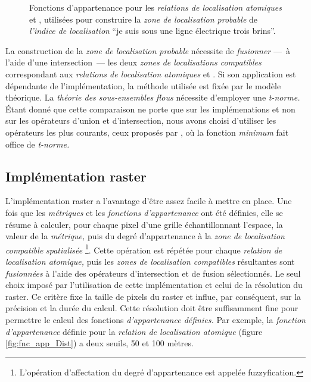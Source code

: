 \begin{figure}
  \centering \subfloat[]{%
    
    \label{fig:fnc_app_Dist}
  }
  \hfill%
  \subfloat[]{%
    
    \label{fig:fnc_app_AltInf}
  }
  \caption{Fonctions d'appartenance pour les \emph{relations de
      localisation atomiques}
    \protect{}
    \protect{} et
    \protect{}
    \protect{}, utilisées pour construire la
    \emph{zone de localisation probable} de \emph{l'indice de
      localisation} \enquote{je suis sous une ligne électrique trois
      brins}.}
  \label{fig:fnc_app_sousProche}
\end{figure}

La construction de la \emph{zone de localisation probable} nécessite
de \emph{fusionner} ---~à l'aide d'une intersection~--- les deux
\emph{zones de localisations compatibles} correspondant aux
\emph{relations de localisation atomiques}
 et
. Si son application est dépendante de
l'implémentation, la méthode utilisée est fixée par le modèle
théorique. La \emph{théorie des sous-ensembles flous} nécessite
d'employer une \emph{t-norme.} Étant donné que cette comparaison ne
porte que sur les implémenations et non sur les opérateurs d'union et
d'intersection, nous avons choisi d'utiliser les opérateurs les plus
courants, ceux proposés par \textcite{Zadeh1965}, où la fonction
\emph{minimum} fait office de \emph{t-norme.}

\subsection{Implémentation raster}

L'implémentation raster a l'avantage d'être assez facile à mettre en
place. Une fois que les \emph{métriques} et les \emph{fonctions
  d’appartenance} ont été définies, elle se résume à calculer, pour
chaque pixel d'une grille échantillonnant l'espace, la valeur de la
\emph{métrique,} puis du degré d'appartenance à la \emph{zone de
  localisation compatible} \emph{spatialisée} \footnote{L'opération
  d'affectation du degré d'appartenance est appelée
  fuzzyfication.}. Cette opération est répétée pour chaque
\emph{relation de localisation atomique,} puis les \emph{zones de
  localisation compatibles} résultantes sont \emph{fusionnées} à
l'aide des opérateurs d'intersection et de fusion sélectionnés. Le
seul choix imposé par l'utilisation de cette implémentation et celui
de la résolution du raster. Ce critère fixe la taille de pixels du
raster et influe, par conséquent, sur la précision et la durée du
calcul. Cette résolution doit être suffisamment fine pour permettre le
calcul des fonctions \emph{d'appartenance définies.} Par exemple, la
\emph{fonction d'appartenance} définie pour la \emph{relation de
  localisation atomique}  (figure
\ref{fig:fnc_app_Dist}) a deux seuils, \num{50} et 100 mètres.

